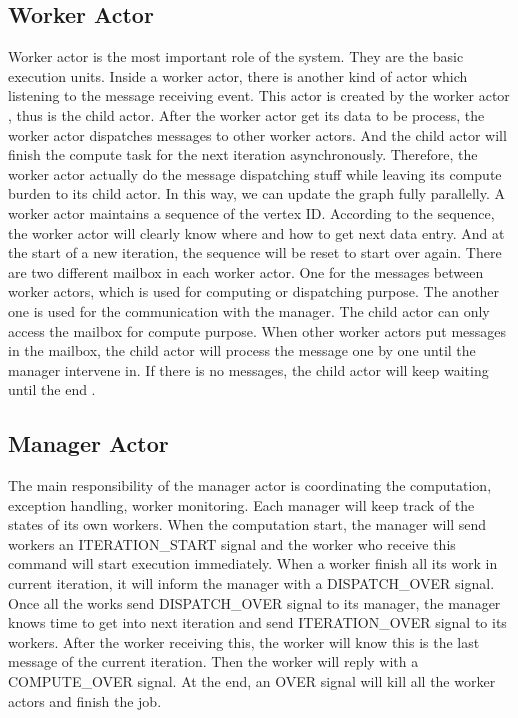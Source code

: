 \documentclass[twocolumn,a4paper,10pt]{article}
\begin{document}
\subsection{Worker Actor}
Worker actor is the most important role of the system. They are the basic execution units. Inside a worker actor, there is another kind of actor which listening to the message receiving event. This actor is created by the worker actor , thus is the child actor. After the worker actor get its data to be process, the worker actor dispatches messages to other worker actors. And the child actor will finish the compute task for the next iteration asynchronously. Therefore, the worker actor actually do the message dispatching stuff while leaving its compute burden to its child actor. In this way, we can update the graph fully parallelly.\newline
A worker actor maintains a sequence of the vertex ID. According to the sequence, the worker actor will clearly know where and how to get next data entry. And at the start of a new iteration, the sequence will be reset to start over again. There are two different mailbox in each worker actor. One for the messages between worker actors, which is used for computing or dispatching purpose. The another one is used for the communication with the manager. The child actor can only access the mailbox for compute purpose. When other worker actors put messages in the mailbox, the child actor will process the message one by one until the manager intervene in. If there is no messages, the child actor will keep waiting until the end .
\subsection{Manager Actor}
The main responsibility of the manager actor is coordinating the computation, exception handling, worker monitoring. Each manager will keep track of the states of its own workers. When the computation start, the manager will send workers an ITERATION\_START signal and the worker who receive this command will start execution immediately. When a worker finish all its work in current iteration, it will inform the manager with a DISPATCH\_OVER signal. Once all the works send DISPATCH\_OVER signal to its manager, the manager knows time to get into next iteration and send ITERATION\_OVER signal to its workers. After the worker receiving this, the worker will know this is the last message of the current iteration. Then the worker will reply with a COMPUTE\_OVER signal. At the end, an OVER signal will kill all the worker actors and finish the job.
\end{document}
